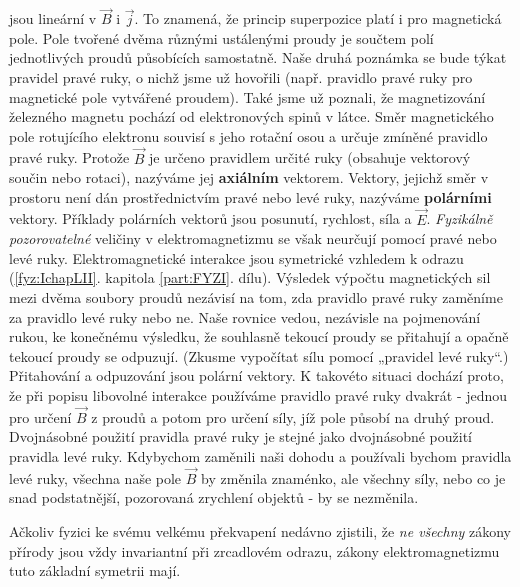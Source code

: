     jsou lineární v \(\vec{B}\) i \(\vec{j}\). To znamená, že princip superpozice platí i pro
    magnetická pole. Pole tvořené dvěma různými ustálenými proudy je součtem polí jednotlivých
    proudů působících samostatně. Naše druhá poznámka se bude týkat pravidel pravé ruky, o nichž
    jsme už hovořili (např. pravidlo pravé ruky pro magnetické pole vytvářené proudem). Také jsme už
    poznali, že magnetizování železného magnetu pochází od elektronových spinů v látce. Směr
    magnetického pole rotujícího elektronu souvisí s jeho rotační osou a určuje zmíněné pravidlo
    pravé ruky. Protože \(\vec{B}\) je určeno pravidlem určité ruky (obsahuje vektorový součin nebo
    rotaci), nazýváme jej \textbf{axiálním} vektorem. Vektory, jejichž směr v prostoru není dán
    prostřednictvím pravé nebo levé ruky, nazýváme \textbf{polárními} vektory. Příklady polárních
    vektorů jsou posunutí, rychlost, síla a \(\vec{E}\). \emph{Fyzikálně pozorovatelné} veličiny v
    elektromagnetizmu se však neurčují pomocí pravé nebo levé ruky. Elektromagnetické interakce jsou
    symetrické vzhledem k odrazu (\ref{fyz:IchapLII}. kapitola \ref{part:FYZI}. dílu). Výsledek
    výpočtu magnetických sil mezi dvěma soubory proudů nezávisí na tom, zda pravidlo pravé ruky
    zaměníme za pravidlo levé ruky nebo ne. Naše rovnice vedou, nezávisle na pojmenování rukou, ke
    konečnému výsledku, že souhlasně tekoucí proudy se přitahují a opačně tekoucí proudy se
    odpuzují. (Zkusme vypočítat sílu pomocí „pravidel levé ruky“.) Přitahování a odpuzování jsou
    polární vektory. K takovéto situaci dochází proto, že při popisu libovolné interakce používáme
    pravidlo pravé ruky dvakrát - jednou pro určení \(\vec{B}\) z proudů a potom pro určení síly,
    jíž pole působí na druhý proud. Dvojnásobné použití pravidla pravé ruky je stejné jako
    dvojnásobné použití pravidla levé ruky. Kdybychom zaměnili naši dohodu a používali bychom
    pravidla levé ruky, všechna naše pole \(\vec{B}\) by změnila znaménko, ale všechny síly, nebo co
    je snad podstatnější, pozorovaná zrychlení objektů - by se nezměnila.
    
    Ačkoliv fyzici ke svému velkému překvapení nedávno zjistili, že \emph{ne všechny} zákony přírody
    jsou vždy invariantní při zrcadlovém odrazu, zákony elektromagnetizmu tuto základní symetrii
    mají.

